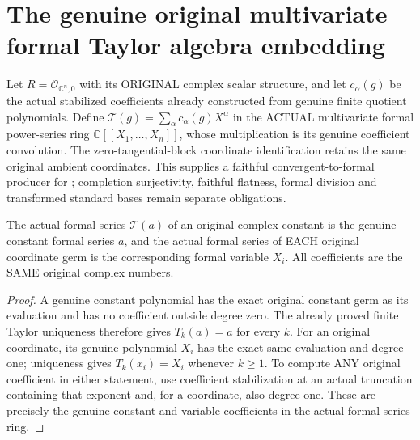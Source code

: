 \section{The genuine original multivariate formal Taylor algebra embedding}

Let $R=\mathcal O_{\mathbb C^n,0}$ with its ORIGINAL complex scalar
structure, and let $c_\alpha(g)$ be the actual stabilized coefficients
already constructed from genuine finite quotient polynomials. Define
$\mathcal T(g)=\sum_\alpha c_\alpha(g)X^\alpha$ in the ACTUAL
multivariate formal power-series ring $\mathbb C[[X_1,\ldots,X_n]]$,
whose multiplication is its genuine coefficient convolution. The
zero-tangential-block coordinate identification retains the same original
ambient coordinates. This supplies a faithful convergent-to-formal
producer for \cite[\S7]{bierstone-milman97-invent-math}; completion
surjectivity, faithful flatness, formal division and transformed standard
bases remain separate obligations.

\begin{lemma}
\label{hir:actual-original-formal-taylor-constants-coordinates}
\leanok
The actual formal series $\mathcal T(a)$ of an original complex constant
is the genuine constant formal series $a$, and the actual formal series
of EACH original coordinate germ is the corresponding formal variable
$X_i$. All coefficients are the SAME original complex numbers.
\end{lemma}
\begin{proof}
A genuine constant polynomial has the exact original constant germ as its
evaluation and has no coefficient outside degree zero. The already proved
finite Taylor uniqueness therefore gives $T_k(a)=a$ for every $k$.
For an original coordinate, its genuine polynomial $X_i$ has the exact
same evaluation and degree one; uniqueness gives $T_k(x_i)=X_i$ whenever
$k\ge1$. To compute ANY original coefficient in either statement, use
coefficient stabilization at an actual truncation containing that exponent
and, for a coordinate, also degree one. These are precisely the genuine
constant and variable coefficients in the actual formal-series ring.
\end{proof}

